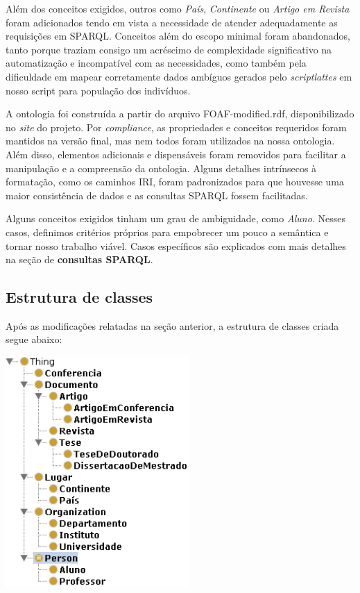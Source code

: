 \documentclass[11pt]{article}
\begin{document}
	Além dos conceitos exigidos, outros como \textit{País}, \textit{Continente} ou \textit{Artigo em Revista} foram adicionados tendo em vista a necessidade de atender adequadamente as requisições em SPARQL. Conceitos além do escopo minimal foram abandonados, tanto porque traziam consigo um acréscimo de complexidade significativo na automatização e incompatível com as necessidades, como também pela dificuldade em mapear corretamente dados ambíguos gerados pelo \textit{scriptlattes} em nosso script para população dos indivíduos.
	
	A ontologia foi construída a partir do arquivo FOAF-modified.rdf, disponibilizado no \textit{site} do projeto. Por \textit{compliance}, as propriedades e conceitos requeridos foram mantidos na versão final, mas nem todos foram utilizados na nossa ontologia. Além disso, elementos adicionais e dispensáveis foram removidos para facilitar a manipulação e a compreensão da ontologia. Alguns detalhes intrínsecos à formatação, como os caminhos IRI, foram padronizados para que houvesse uma maior consistência de dados e as consultas SPARQL fossem facilitadas.
	
	Alguns conceitos exigidos tinham um grau de ambiguidade, como \textit{Aluno}. Nesses casos, definimos critérios próprios para empobrecer um pouco a semântica e tornar nosso trabalho viável. Casos específicos são explicados com mais detalhes na seção de \textbf{consultas SPARQL}.
	
	\subsection{Estrutura de classes}
		Após as modificações relatadas na seção anterior, a estrutura de classes criada segue abaixo:
		
		\begin{center}
			\includegraphics[width=7cm]{classes.png}
		\end{center}
		
	 
\end{document}
